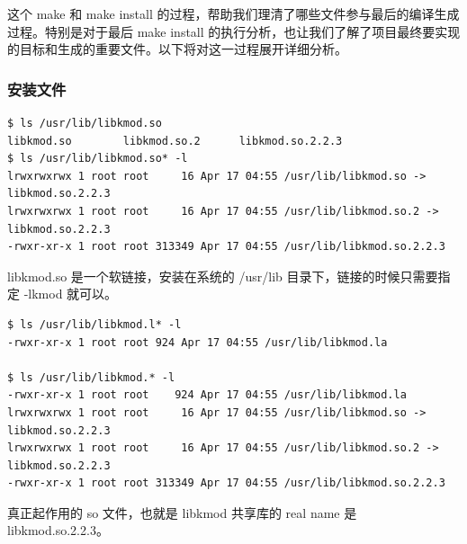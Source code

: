 \documentclass[11pt,a4paper]{article}
\begin{document}
这个 make 和 make install
的过程，帮助我们理清了哪些文件参与最后的编译生成过程。特别是对于最后 make
install
的执行分析，也让我们了解了项目最终要实现的目标和生成的重要文件。以下将对这一过程展开详细分析。

\subsubsection{安装文件}

{\begin{shaded}\begin{verbatim}
$ ls /usr/lib/libkmod.so
libkmod.so        libkmod.so.2      libkmod.so.2.2.3  
$ ls /usr/lib/libkmod.so* -l
lrwxrwxrwx 1 root root     16 Apr 17 04:55 /usr/lib/libkmod.so -> libkmod.so.2.2.3
lrwxrwxrwx 1 root root     16 Apr 17 04:55 /usr/lib/libkmod.so.2 -> libkmod.so.2.2.3
-rwxr-xr-x 1 root root 313349 Apr 17 04:55 /usr/lib/libkmod.so.2.2.3
\end{verbatim}\end{shaded}}
libkmod.so 是一个软链接，安装在系统的 /usr/lib
目录下，链接的时候只需要指定 -lkmod 就可以。

{\begin{shaded}\begin{verbatim}
$ ls /usr/lib/libkmod.l* -l
-rwxr-xr-x 1 root root 924 Apr 17 04:55 /usr/lib/libkmod.la

$ ls /usr/lib/libkmod.* -l
-rwxr-xr-x 1 root root    924 Apr 17 04:55 /usr/lib/libkmod.la
lrwxrwxrwx 1 root root     16 Apr 17 04:55 /usr/lib/libkmod.so -> libkmod.so.2.2.3
lrwxrwxrwx 1 root root     16 Apr 17 04:55 /usr/lib/libkmod.so.2 -> libkmod.so.2.2.3
-rwxr-xr-x 1 root root 313349 Apr 17 04:55 /usr/lib/libkmod.so.2.2.3
\end{verbatim}\end{shaded}}
真正起作用的 so 文件，也就是 libkmod 共享库的 real name 是
libkmod.so.2.2.3。
\end{document}
